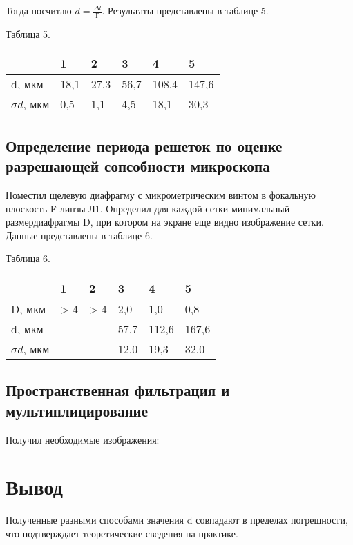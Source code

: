 Тогда посчитаю $ d = \frac{\Delta l}{\texttt{Г}} $. Результаты представлены в таблице 5.

\begin{table}[h!]
    \begin{center}
    Таблица 5. \\
    \begin{tabular}{|l|l|l|l|l|l|}
    \hline
                      & 1    & 2    & 3    & 4     & 5     \\ \hline
    d, мкм            & 18,1 & 27,3 & 56,7 & 108,4 & 147,6 \\ \hline
    $ \sigma d $, мкм & 0,5  & 1,1  & 4,5  & 18,1  & 30,3  \\ \hline

    \end{tabular}
    \end{center}
\end{table}

\subsection{Определение периода решеток по оценке разрешающей сопсобности микроскопа}

Поместил щелевую диафрагму с микрометрическим винтом в фокальную плоскость F линзы Л1.
Определил для каждой сетки минимальный размердиафрагмы D, при котором на экране еще
видно изображение сетки. Данные представлены в таблице 6.

\begin{table}[h!]
    \begin{center}
    Таблица 6. \\
    \begin{tabular}{|l|l|l|l|l|l|}
    \hline
                      & 1    & 2    & 3    & 4     & 5     \\ \hline
    D, мкм            & > 4  & > 4  & 2,0  & 1,0   & 0,8   \\ \hline
    d, мкм            & ---  & ---  & 57,7 & 112,6 & 167,6 \\ \hline
    $ \sigma d $, мкм & ---  & ---  & 12,0 & 19,3  & 32,0  \\ \hline

    \end{tabular}
    \end{center}
\end{table}

\subsection{Пространственная фильтрация и мультиплицирование}

Получил необходимые изображения:


\newpage

\section{Вывод}

Полученные разными способами значения d совпадают в пределах погрешности, что
подтверждает теоретические сведения на практике.
